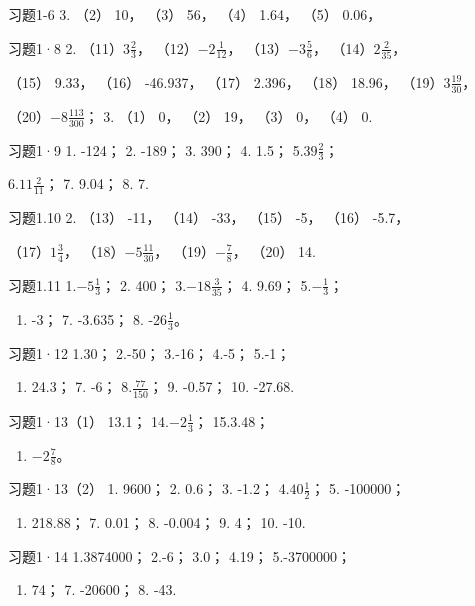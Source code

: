 习题1-6 3. （2） 10， （3） 56， （4） 1.64， （5） 0.06，

习题1·8 2. （11）\(3\frac{2}{3}\)， （12）\(-2\frac{1}{12}\)，
（13）\(-3\frac{5}{6}\)， （14）\(2\frac{2}{35}\)，

（15） 9.33， （16） -46.937， （17） 2.396， （18） 18.96，
（19）\(3\frac{19}{30}\)，

（20）\(-8\frac{113}{300}\)； 3. （1） 0， （2） 19， （3） 0， （4） 0.

习题1·9 1. -124； 2. -189； 3. 390； 4. 1.5； 5.\(39\frac{2}{3}\)；

6.\(11\frac{2}{11}\)； 7. 9.04； 8. 7.

习题1.10 2. （13） -11， （14） -33， （15） -5， （16） -5.7，

（17）\(1\frac{3}{4}\)， （18）\(-5\frac{11}{30}\)，
（19）\(-\frac{7}{8}\)， （20） 14.

习题1.11 1.\(-5\frac{1}{3}\)； 2. 400； 3.\(-18\frac{3}{35}\)； 4.
9.69； 5.\(-\frac{1}{3}\)；

\begin{enumerate}[start=6]
\item
  -3； 7. -3.635； 8. -26\(\frac{1}{3}\)。
\end{enumerate}

习题1·12 1.30； 2.-50； 3.-16； 4.-5； 5.-1；

\begin{enumerate}[start=6]
\item
  24.3； 7. -6； 8.\(\frac{77}{150}\)； 9. -0.57； 10. -27.68.
\end{enumerate}

习题1·13（1） 13.1； 14.\(-2\frac{1}{3}\)； 15.3.48；
\begin{enumerate}[start=16]
\item
  \(-2\frac{7}{8}\)。
\end{enumerate}

习题1·13（2） 1. 9600； 2. 0.6； 3. -1.2； 4.\(40\frac{1}{2}\)； 5.
-100000；

\begin{enumerate}[start=6]
\item
  218.88； 7. 0.01； 8. -0.004； 9. 4； 10. -10.
\end{enumerate}

习题1·14 1.3874000； 2.-6； 3.0； 4.19； 5.-3700000；

\begin{enumerate}[start=6]
\item
  74； 7. -20600； 8. -43.
\end{enumerate}

